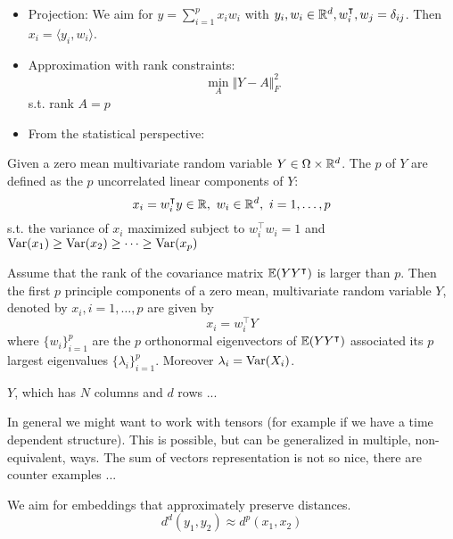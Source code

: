 \begin{itemize}
    \item Projection: We aim for $y=\sum_{i=1}^p x_i w_i$ with $y_i,w_i\in\mathbb{R}^d, w_i^\intercal,w_j=\delta_{ij}$. Then $x_i=\langle y_i,w_i\rangle$.
    \item Approximation with rank constraints:\[\min_{A}\Vert Y-A\Vert_{F}^2\] s.t. rank $A=p$
    \item From the statistical perspective: 
\end{itemize}

\begin{definition}\label{def:2.2}
    Given a zero mean multivariate random variable $Y\in\Omega\times \mathbb{R}^d$. The $p$  of $Y$
    are defined as the $p$ uncorrelated linear components of $Y$:\[x_i=w_i^\intercal y\in\mathbb{R},\text{ } w_i\in\mathbb{R}^d,\text{ }i=1,\dots,p\] s.t. the variance of $x_i$ maximized subject to $w_i^\intercal w_i=1$  and $\text{Var}(x_1)\geq \text{Var}(x_2)\geq\dots\geq \text{Var}(x_p)$
\end{definition}

\begin{theorem}\label{thm:2.3}
    Assume that the rank of the covariance matrix $\mathbb{E}(YY^\intercal)$ is larger than $p$. Then the first 
    $p$ principle components of a zero mean, multivariate random variable $Y$, denoted by $x_i,i=1,\dots,p$ are given by 
    \[x_i=w_i^\intercal Y\]
    where $\{w_i\}_{i=1}^p$ are the $p$ orthonormal eigenvectors of $\mathbb{E}(YY^\intercal)$ associated 
    its $p$ largest eigenvalues $\{\lambda_i\}_{i=1}^p$. Moreover $\lambda_i=\text{Var}(X_i)$.
\end{theorem}

\begin{aremark}
    $Y$, which has $N$ columns and $d$ rows ... %
\end{aremark}

\begin{aremark}
    In general we might want to work with tensors (for example if we have a time dependent structure). This is possible, but can be generalized 
    in multiple, non-equivalent, ways. The sum of vectors representation is not so nice, there are counter examples ... 
\end{aremark}

We aim for embeddings that approximately preserve distances. 
\[d^d(y_1,y_2)\approx d^p(x_1,x_2)\]

